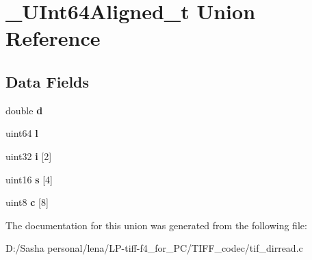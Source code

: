 \hypertarget{union___u_int64_aligned__t}{}\section{\+\_\+\+U\+Int64\+Aligned\+\_\+t Union Reference}
\label{union___u_int64_aligned__t}
\subsection*{Data Fields}
\begin{DoxyCompactItemize}
\item 
\hypertarget{union___u_int64_aligned__t_a873684cefeb665f3d5e6b495de57fc0d}{}double {\bfseries d}\label{union___u_int64_aligned__t_a873684cefeb665f3d5e6b495de57fc0d}

\item 
\hypertarget{union___u_int64_aligned__t_ac54c6e32b242851e556101f5f4a56ed4}{}uint64 {\bfseries l}\label{union___u_int64_aligned__t_ac54c6e32b242851e556101f5f4a56ed4}

\item 
\hypertarget{union___u_int64_aligned__t_a93549b451787c42eea10963ee06c5684}{}uint32 {\bfseries i} \mbox{[}2\mbox{]}\label{union___u_int64_aligned__t_a93549b451787c42eea10963ee06c5684}

\item 
\hypertarget{union___u_int64_aligned__t_afbb2368fc191edaee523c1b92f4da67a}{}uint16 {\bfseries s} \mbox{[}4\mbox{]}\label{union___u_int64_aligned__t_afbb2368fc191edaee523c1b92f4da67a}

\item 
\hypertarget{union___u_int64_aligned__t_a474b72c3da4de66411578d6f084cb824}{}uint8 {\bfseries c} \mbox{[}8\mbox{]}\label{union___u_int64_aligned__t_a474b72c3da4de66411578d6f084cb824}

\end{DoxyCompactItemize}


The documentation for this union was generated from the following file\+:\begin{DoxyCompactItemize}
\item 
D\+:/\+Sasha personal/lena/\+L\+P-\/tiff-\/f4\+\_\+for\+\_\+\+P\+C/\+T\+I\+F\+F\+\_\+codec/tif\+\_\+dirread.\+c\end{DoxyCompactItemize}
